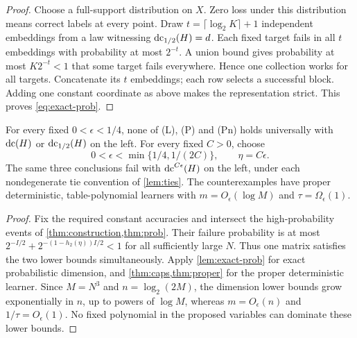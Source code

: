 \begin{proof}
Choose a full-support distribution on $X$. Zero loss under this distribution means correct labels at every point. Draw $t=\lceil\log_2K\rceil+1$ independent embeddings from a law witnessing $\operatorname{dc}_{1/2}(H)=d$. Each fixed target fails in all $t$ embeddings with probability at most $2^{-t}$. A union bound gives probability at most $K2^{-t}<1$ that some target fails everywhere. Hence one collection works for all targets. Concatenate its $t$ embeddings; each row selects a successful block. Adding one constant coordinate as above makes the representation strict. This proves \eqref{eq:exact-prob}. 
\end{proof}



\begin{corollary}\label{cor:negative-answer}
For every fixed $0<\epsilon<1/4$, none of (L), (P) and (Pn) holds universally with $\operatorname{dc}(H)$ or $\operatorname{dc}_{1/2}(H)$ on the left. For every fixed $C>0$, choose
\[
 0<\epsilon<\min\{1/4,1/(2C)\},\qquad\eta=C\epsilon.
\]
The same three conclusions fail with $\operatorname{dc}^{C\epsilon}(H)$ on the left, under each nondegenerate tie convention of \cref{lem:ties}. The counterexamples have proper deterministic, table-polynomial learners with $m=O_\epsilon(\log M)$ and $\tau=\Omega_\epsilon(1)$.
\end{corollary}
\begin{proof}
Fix the required constant accuracies and intersect the high-probability events of \cref{thm:construction,thm:prob}. Their failure probability is at most $2^{-I/2}+2^{-(1-h_2(\eta))I/2}<1$ for all sufficiently large $N$. Thus one matrix satisfies the two lower bounds simultaneously. Apply \cref{lem:exact-prob} for exact probabilistic dimension, and \cref{thm:caps,thm:proper} for the proper deterministic learner. Since $M=N^3$ and $n=\log_2(2M)$, the dimension lower bounds grow exponentially in $n$, up to powers of $\log M$, whereas $m=O_\epsilon(n)$ and $1/\tau=O_\epsilon(1)$. No fixed polynomial in the proposed variables can dominate these lower bounds.
\end{proof}

